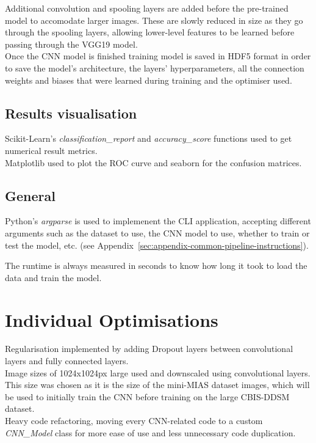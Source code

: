 Additional convolution and spooling layers are added before the pre-trained model to accomodate larger images. These are slowly reduced in size as they go through the spooling layers, allowing lower-level features to be learned before passing through the VGG19 model.\\

Once the CNN model is finished training model is saved in HDF5 format in order to save the model's architecture, the layers' hyperparameters, all the connection weights and biases that were learned during training \citep{Geron2019} and the optimiser used.


\subsection{Results visualisation}

Scikit-Learn's \textit{classification\_report} and \textit{accuracy\_score} functions used to get numerical result metrics.\\

Matplotlib used to plot the ROC curve and seaborn for the confusion matrices.


\subsection{General}

Python's \textit{argparse} is used to implemenent the CLI application, accepting different arguments such as the dataset to use, the CNN model to use, whether to train or test the model, etc. (see Appendix~\ref{sec:appendix-common-pipeline-instructions}).

The runtime is always measured in seconds to know how long it took to load the data and train the model.


\section{Individual Optimisations}

Regularisation implemented by adding Dropout layers between convolutional layers and fully connected layers.\\

Image sizes of 1024x1024px large used and downscaled using convolutional layers. This size was chosen as it is the size of the mini-MIAS dataset images, which will be used to initially train the CNN before training on the large CBIS-DDSM dataset.\\

Heavy code refactoring, moving every CNN-related code to a custom \textit{CNN\_Model} class for more ease of use and less unnecessary code duplication.